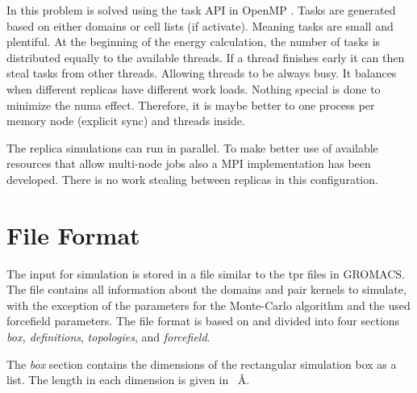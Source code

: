 \documentclass[12pt, twoside]{report}
\begin{document}
In \complexes this problem is solved using the task \gls{API} in OpenMP
\cite{openMP}. Tasks are generated based on either domains or cell lists (if
activate). Meaning tasks are small and plentiful. At the beginning of the energy
calculation, the number of tasks is distributed equally to the available
threads. If a thread finishes early it can then steal tasks from other threads.
Allowing threads to be always busy. It balances when different replicas have
different work loads. Nothing special is done to minimize the numa effect.
Therefore, it is maybe better to one process per memory node (explicit sync) and
threads inside.

The replica simulations can run in parallel. To make better use of available
resources that allow multi-node jobs also a \gls{MPI} implementation has been
developed. There is no work stealing between replicas in this configuration.

\section{\cplx File Format}

The input for \complexes simulation is stored in a \cplx file similar to the tpr
files in GROMACS. The \cplx file contains all information about the domains and
pair kernels to simulate, with the exception of the parameters for the
Monte-Carlo algorithm and the used forcefield parameters. The \cplx file format
is based on \yaml\cite{YAML} and divided into four sections \textit{box,
definitions}, \textit{topologies}, and \textit{forcefield}.

The \textit{box} section contains the dimensions of the rectangular simulation
box as a \yaml list. The length in each dimension is given in \SI{}{\AA}.
\end{document}
